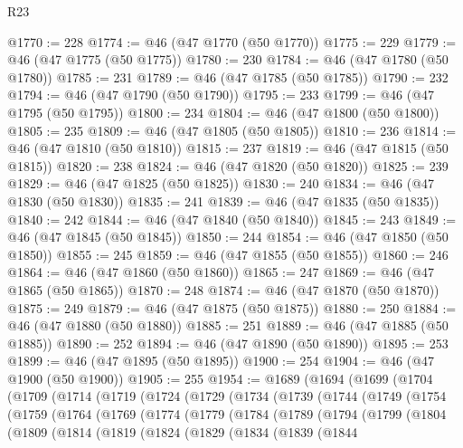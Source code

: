 \begin{lexlean}{R23}
\begin{coremodule}
{{{{{{{{{{{{{{{{{{{{{@1770 := 228
@1774 := @46 (@47 @1770 (@50 @1770))
@1775 := 229
@1779 := @46 (@47 @1775 (@50 @1775))
@1780 := 230
@1784 := @46 (@47 @1780 (@50 @1780))
@1785 := 231
@1789 := @46 (@47 @1785 (@50 @1785))
@1790 := 232
@1794 := @46 (@47 @1790 (@50 @1790))
@1795 := 233
@1799 := @46 (@47 @1795 (@50 @1795))
@1800 := 234
@1804 := @46 (@47 @1800 (@50 @1800))
@1805 := 235
@1809 := @46 (@47 @1805 (@50 @1805))
@1810 := 236
@1814 := @46 (@47 @1810 (@50 @1810))
@1815 := 237
@1819 := @46 (@47 @1815 (@50 @1815))
@1820 := 238
@1824 := @46 (@47 @1820 (@50 @1820))
@1825 := 239
@1829 := @46 (@47 @1825 (@50 @1825))
@1830 := 240
@1834 := @46 (@47 @1830 (@50 @1830))
@1835 := 241
@1839 := @46 (@47 @1835 (@50 @1835))
@1840 := 242
@1844 := @46 (@47 @1840 (@50 @1840))
@1845 := 243
@1849 := @46 (@47 @1845 (@50 @1845))
@1850 := 244
@1854 := @46 (@47 @1850 (@50 @1850))
@1855 := 245
@1859 := @46 (@47 @1855 (@50 @1855))
@1860 := 246
@1864 := @46 (@47 @1860 (@50 @1860))
@1865 := 247
@1869 := @46 (@47 @1865 (@50 @1865))
@1870 := 248
@1874 := @46 (@47 @1870 (@50 @1870))
@1875 := 249
@1879 := @46 (@47 @1875 (@50 @1875))
@1880 := 250
@1884 := @46 (@47 @1880 (@50 @1880))
@1885 := 251
@1889 := @46 (@47 @1885 (@50 @1885))
@1890 := 252
@1894 := @46 (@47 @1890 (@50 @1890))
@1895 := 253
@1899 := @46 (@47 @1895 (@50 @1895))
@1900 := 254
@1904 := @46 (@47 @1900 (@50 @1900))
@1905 := 255
@1954 := @1689
    (@1694
      (@1699
        (@1704
          (@1709
            (@1714
              (@1719
                (@1724
                  (@1729
                    (@1734
                      (@1739
                        (@1744
                          (@1749
                            (@1754
                              (@1759
                                (@1764
                                  (@1769
                                    (@1774
                                      (@1779
                                        (@1784
                                          (@1789
                                            (@1794
                                              (@1799
                                                (@1804
                                                  (@1809
                                                    (@1814
                                                      (@1819
                                                        (@1824
                                                          (@1829
                                                            (@1834
                                                              (@1839
                                                                (@1844
}}}}}}}}}}}}}}}}}}}}}
\end{coremodule}
\end{lexlean}
